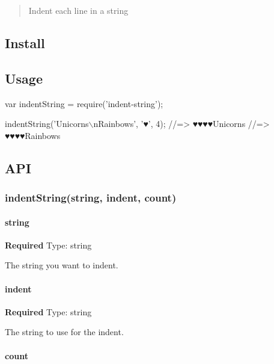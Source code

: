 \begin{quote}
Indent each line in a string \end{quote}


\subsection*{Install}




\subsection*{Usage}


\begin{DoxyCode}
var indentString = require('indent-string');

indentString('Unicorns\(\backslash\)nRainbows', '♥', 4);
//=> ♥♥♥♥Unicorns
//=> ♥♥♥♥Rainbows
\end{DoxyCode}


\subsection*{A\+PI}

\subsubsection*{indent\+String(string, indent, count)}

\paragraph*{string}

{\bfseries Required} Type\+: {\ttfamily string}

The string you want to indent.

\paragraph*{indent}

{\bfseries Required} Type\+: {\ttfamily string}

The string to use for the indent.

\paragraph*{count}

